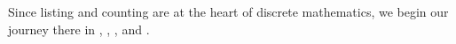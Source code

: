 Since listing and counting
 are at the heart of discrete mathematics,
  we begin our journey there in 
   \seclisting, 
   \seccountingstepscases,  
   \seccountingsubsets, 
  and  \secbitstrings.

